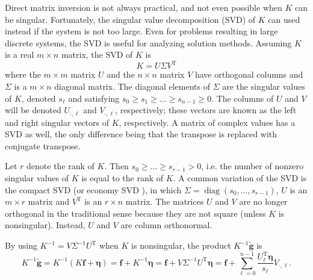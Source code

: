 \documentclass[12pt,notitlepage]{report}
\newcommand{\gnoiseVec}{\widetilde{\mathbf{g}}}	%
\newcommand{\kMat}{K}	%
\newcommand{\fVec}{\mathbf{f}}	%
\newcommand{\trans}{\mathrm{T}}	%
\DeclareMathOperator{\diag}{diag}	%
\newcommand{\noise}{\eta}	%
\newcommand{\noiseVec}{\bm{\noise}}	%
\newcommand{\singular}{s}	%
\begin{document}
Direct matrix inversion is not always practical, and not even possible when $\kMat$ can be singular. Fortunately, the singular value decomposition (SVD) of $\kMat$ can used instead if the system is not too large. Even for problems resulting in large discrete systems, the SVD is useful for analyzing solution methods.  Assuming $\kMat$ is a real $m \times n$ matrix, the SVD of $\kMat$ is
\begin{equation}
\kMat = U\Sigma{V^\trans}
\label{eq:SVD}
\end{equation}
where the $m \times m$ matrix $U$ and the $n \times n$ matrix $V$ have orthogonal columns and $\Sigma$ is a $m \times n$ diagonal matrix. The diagonal elements of $\Sigma$ are the singular values of $\kMat$, denoted $\singular_\ell$ and satisfying $\singular_0 \geq \singular_1 \geq \ldots \geq \singular_{n-1} \geq 0$. The columns of $U$ and $V$ will be denoted $U_{\cdot,\ell}$ and $V_{\cdot,\ell}$, respectively; these vectors are known as the left and right singular vectors of $\kMat$, respectively. A matrix of complex values has a SVD as well, the only difference being that the transpose is replaced with conjugate transpose. \par
Let $r$ denote the rank of $\kMat$. Then $\singular_0 \geq \ldots \geq \singular_{r-1} > 0$, i.e. the number of nonzero singular values of $\kMat$ is equal to the rank of $\kMat$.  A common variation of the SVD is the compact SVD (or economy SVD \cite{GolubVanLoan2013}), in which $\Sigma = \diag(\singular_0,\ldots,\singular_{r-1})$, $U$ is an $m \times r$ matrix and $V^\trans$ is an $r \times n$ matrix. The matrices $U$ and $V$ are no longer orthogonal in the traditional sense because they are not square (unless $\kMat$ is nonsingular). Instead, $U$ and $V$ are column orthonormal. \par 
By using $\kMat^{-1} = V\Sigma^{-1}U^\trans$ when $\kMat$ is nonsingular, the product $\kMat^{-1}\gnoiseVec$ is
\begin{equation}
\kMat^{-1}\gnoiseVec = \kMat^{-1}\left(\kMat\fVec + \noiseVec\right) = \fVec + \kMat^{-1}\noiseVec = \fVec + V\Sigma^{-1}{U^\trans}\noiseVec = \fVec + \sum_{\ell = 0}^{n-1} \frac{{U^\trans_\ell}\noiseVec}{\singular_\ell}V_{\cdot,\ell}. 
\label{eq:InvProd}
\end{equation}
\end{document}
